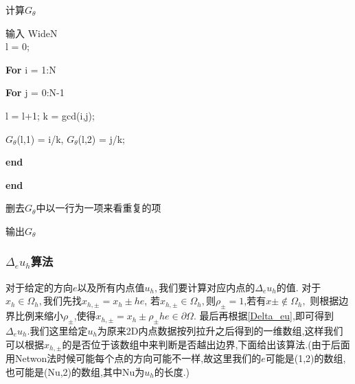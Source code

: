 \documentclass[11pt]{article}
\begin{document}
\begin{algorithm}[H]
\caption{计算$G_\theta$} 
\begin{algorithmic}[]
\STATE 输入 WideN\\

\STATE l = 0;
 
\STATE  \textbf{For} i = 1:N

\STATE \qquad \textbf{For} j = 0:N-1

\STATE \qquad \qquad l = l+1;
\STATE \qquad \qquad k = gcd(i,j);

\STATE \qquad \qquad $G_\theta$(l,1) = i/k, $G_\theta$(l,2) = j/k;

\STATE \qquad \textbf{end}

\STATE \textbf{end}

\STATE 删去$G_\theta$中以一行为一项来看重复的项

\STATE 输出$G_\theta$

\end{algorithmic}
\end{algorithm}


\subsubsection{$\Delta_eu_h$算法}
对于给定的方向$e$以及所有内点值$u_h,$我们要计算对应内点的$\Delta_eu_h$的值. 对于$x_h\in \Omega_h,$我们先找$x_{h,\pm}=x_h\pm he$, 若$x_{h,\pm}\in\Omega_h,$则$\rho_\pm=1$,若有$x\pm\notin\Omega_h,$ 则根据边界比例来缩小$\rho_\pm$,使得$x_{h,\pm}=x_h\pm\rho_\pm h e\in\partial\Omega$.  最后再根据\eqref{Delta_eu},即可得到$\Delta_eu_h$.我们这里给定$u_h$为原来2D内点数据按列拉升之后得到的一维数组,这样我们可以根据$x_{h,\pm}$的是否位于该数组中来判断是否越出边界,下面给出该算法.(由于后面用Netwon法时候可能每个点的方向可能不一样,故这里我们的$e$可能是(1,2)的数组,也可能是(Nu,2)的数组,其中Nu为$u_h$的长度.)
\end{document}
